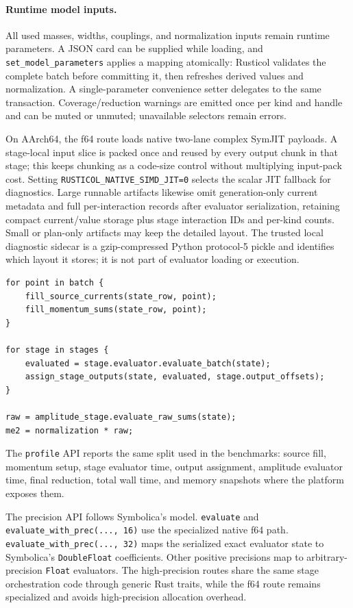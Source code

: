 \documentclass[10pt]{article}
\begin{document}
\paragraph{Runtime model inputs.}
All used masses, widths, couplings, and normalization inputs remain runtime
parameters.  A JSON card can be supplied while loading, and
\texttt{set\_model\_parameters} applies a mapping atomically: Rusticol validates
the complete batch before committing it, then refreshes derived values and
normalization.  A single-parameter convenience setter delegates to the same
transaction.  Coverage/reduction warnings are emitted once per kind and handle
and can be muted or unmuted; unavailable selectors remain errors.

On AArch64, the f64 route loads native two-lane complex SymJIT payloads.  A
stage-local input slice is packed once and reused by every output chunk in that
stage; this keeps chunking as a code-size control without multiplying input-pack
cost.  Setting \texttt{RUSTICOL\_NATIVE\_SIMD\_JIT=0} selects the scalar JIT
fallback for diagnostics.
Large runnable artifacts likewise omit generation-only current metadata and
full per-interaction records after evaluator serialization, retaining compact
current/value storage plus stage interaction IDs and per-kind counts.  Small
or plan-only artifacts may keep the detailed layout.  The trusted local
diagnostic sidecar is a gzip-compressed Python protocol-5 pickle and identifies
which layout it stores; it is not part of evaluator loading or execution.
\begin{lstlisting}
for point in batch {
    fill_source_currents(state_row, point);
    fill_momentum_sums(state_row, point);
}

for stage in stages {
    evaluated = stage.evaluator.evaluate_batch(state);
    assign_stage_outputs(state, evaluated, stage.output_offsets);
}

raw = amplitude_stage.evaluate_raw_sums(state);
me2 = normalization * raw;
\end{lstlisting}
The \texttt{profile} API reports the same split used in the benchmarks: source
fill, momentum setup, stage evaluator time, output assignment, amplitude
evaluator time, final reduction, total wall time, and memory snapshots where the
platform exposes them.

The precision API follows Symbolica's model.  \texttt{evaluate} and
\texttt{evaluate\_with\_prec(..., 16)} use the specialized native f64 path.
\texttt{evaluate\_with\_prec(..., 32)} maps the serialized exact evaluator state
to Symbolica's \texttt{DoubleFloat} coefficients.  Other positive precisions map
to arbitrary-precision \texttt{Float} evaluators.  The high-precision routes
share the same stage orchestration code through generic Rust traits, while the
f64 route remains specialized and avoids high-precision allocation overhead.
\end{document}
